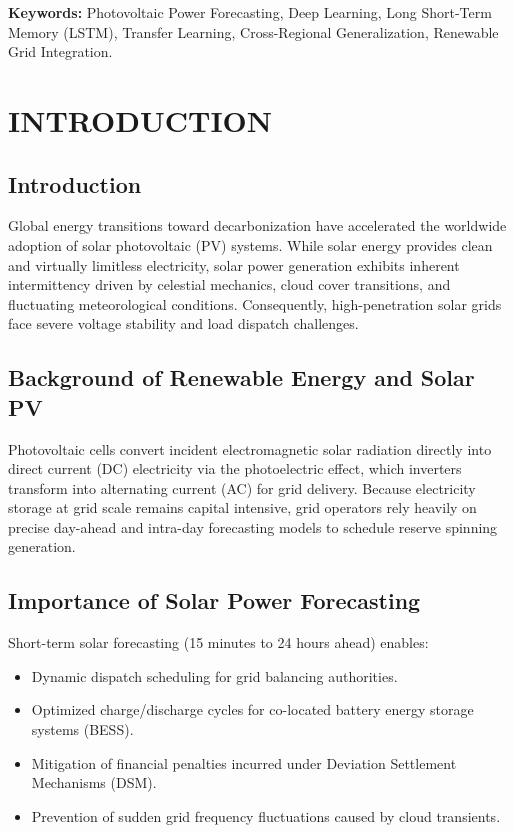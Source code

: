 \documentclass[12pt,a4paper,oneside]{report}
\begin{document}
\noindent \textbf{Keywords:} Photovoltaic Power Forecasting, Deep Learning, Long Short-Term Memory (LSTM), Transfer Learning, Cross-Regional Generalization, Renewable Grid Integration.

\newpage
\tableofcontents
\newpage
\listoftables
\newpage
\listoffigures

\newpage
\chapter{INTRODUCTION}

\section{Introduction}
Global energy transitions toward decarbonization have accelerated the worldwide adoption of solar photovoltaic (PV) systems. While solar energy provides clean and virtually limitless electricity, solar power generation exhibits inherent intermittency driven by celestial mechanics, cloud cover transitions, and fluctuating meteorological conditions. Consequently, high-penetration solar grids face severe voltage stability and load dispatch challenges.

\section{Background of Renewable Energy and Solar PV}
Photovoltaic cells convert incident electromagnetic solar radiation directly into direct current (DC) electricity via the photoelectric effect, which inverters transform into alternating current (AC) for grid delivery. Because electricity storage at grid scale remains capital intensive, grid operators rely heavily on precise day-ahead and intra-day forecasting models to schedule reserve spinning generation.

\section{Importance of Solar Power Forecasting}
Short-term solar forecasting (15 minutes to 24 hours ahead) enables:
\begin{itemize}
    \item Dynamic dispatch scheduling for grid balancing authorities.
    \item Optimized charge/discharge cycles for co-located battery energy storage systems (BESS).
    \item Mitigation of financial penalties incurred under Deviation Settlement Mechanisms (DSM).
    \item Prevention of sudden grid frequency fluctuations caused by cloud transients.
\end{itemize}
\end{document}
